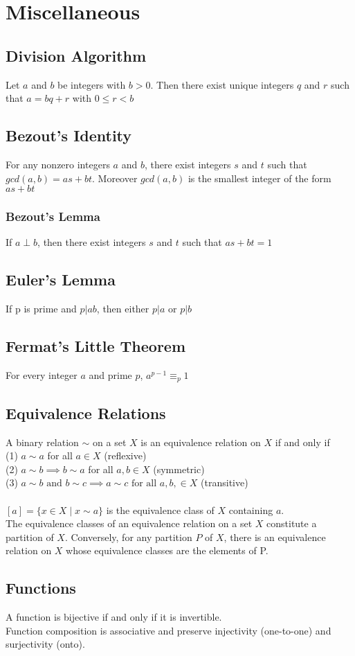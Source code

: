 \documentclass{article}
\begin{document}
\section{Miscellaneous}
\subsection{Division Algorithm}
Let $a$ and $b$ be integers with $b>0$. Then there exist unique integers $q$ and $r$ such that $a = bq + r$ with $0 \leq r < b$
\subsection{Bezout's Identity}
For any nonzero integers $a$ and $b$, there exist integers $s$ and $t$ such that $gcd(a,b) = as + bt$. Moreover $gcd(a,b)$ is the smallest integer of the form $as + bt$
\subsubsection{Bezout's Lemma}
If $a \perp b$, then there exist integers $s$ and $t$ such that $as + bt = 1$
\subsection{Euler's Lemma}
If p is prime and $p | ab$, then either $p | a$ or $p | b$
\subsection{Fermat's Little Theorem}
For every integer $a$ and prime $p$, $a^{p-1} \equiv_p 1$
\subsection{Equivalence Relations}
A binary relation $\sim$ on a set $X$ is an equivalence relation on $X$ if and only if  \\
(1) $a\sim a$ for all $a \in X$ (reflexive) \\
(2) $a \sim b \implies b\sim a$ for all $a, b \in X$ (symmetric) \\
(3) $a\sim b \text{ and } b\sim c \implies a\sim c \text{ for all } a, b, \in X$ (transitive) \\ \\
$[a] = \{x \in X \mid x \sim a\}$ is the equivalence class of $X$ containing $a$. \\
The equivalence classes of an equivalence relation on a set $X$ constitute a partition of $X$. Conversely, for any partition $P$ of $X$, there is an equivalence relation on $X$ whose equivalence classes are the elements of P.
\subsection{Functions}
A function is bijective if and only if it is invertible. \\
Function composition is associative and preserve injectivity (one-to-one) and surjectivity (onto).
\end{document}
